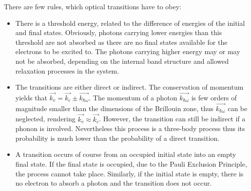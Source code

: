 \documentclass[titlepage,a4paper]{book}
\begin{document}
There are few rules, which optical transitions have to obey:
\begin{itemize}
\item There is a threshold energy, related to the difference of energies of the initial and final states. Obviously, photons carrying lower energies than this threshold are not absorbed as there are no final states available for the electrons to be excited to. The photons carrying higher energy may or may not be absorbed, depending on the internal band structure and allowed relaxation processes in the system.

\item The transitions are either direct or indirect. The conservation of momentum yields that $\vec{k_v} = \vec{k_c} \pm \vec{k_{\hbar\omega}}$. The momentum of a photon $\vec{k_{\hbar\omega}}$ is few orders of magnitude smaller than the dimensions of the Brillouin zone, thus $\vec{k_{\hbar\omega}}$ can be neglected, rendering  $\vec{k_v} \approx \vec{k_c}$. However, the transition can still be indirect if a phonon is involved. Nevertheless this process is a three-body process thus its probability is much lower than the probability of a direct transition.

\item A transition occurs of course from an occupied initial state into an empty final state. If the final state is occupied, due to the Pauli Exclusion Principle, the process cannot take place. Similarly, if the initial state is empty, there is no electron to absorb a photon and the transition does not occur.

\end{itemize}

\end{document}
